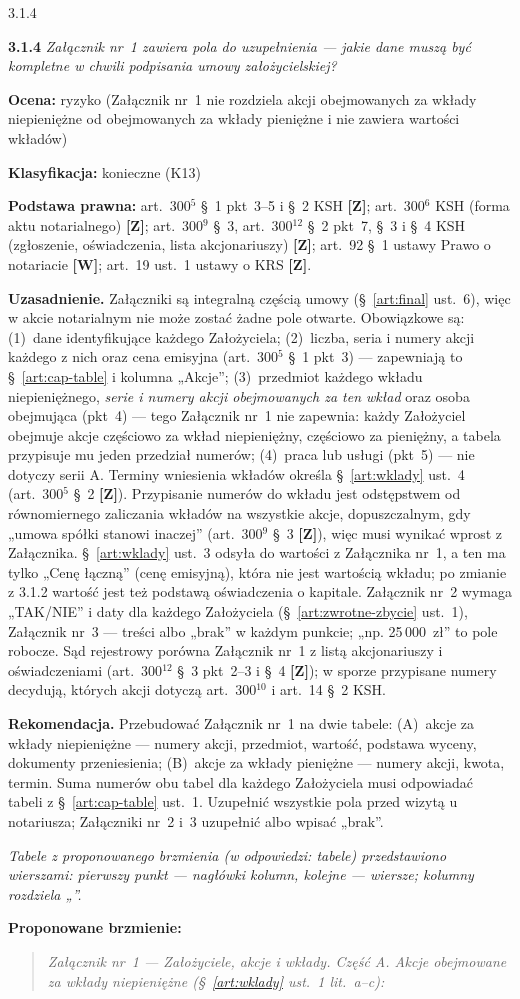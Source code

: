 \documentclass[12pt,a4paper]{report}
\newcommand{\MemoPyt}[2]{\par\noindent\phantomsection\label{memo:#1}\textbf{#1} \textit{#2}\par\smallskip}
\newcommand{\Wiar}[1]{\textbf{[#1]}}
\newcommand{\Ocena}[1]{\textbf{Ocena:} #1\par}
\newcommand{\Podstawa}[1]{\textbf{Podstawa prawna:} #1\par}
\newcommand{\Uzasadnienie}[1]{\textbf{Uzasadnienie.} #1\par}
\newcommand{\Rekomendacja}[1]{\textbf{Rekomendacja.} #1\par}
\newcommand{\Klasa}[1]{\textbf{Klasyfikacja:} #1\par}
\newenvironment{Brzmienie}{\par\textbf{Proponowane brzmienie:}\begin{quote}\itshape}{\end{quote}}
\begin{document}
\begin{MemoBox}{3.1.4}
\MemoPyt{3.1.4}{Załącznik nr~1 zawiera pola do uzupełnienia --- jakie dane muszą być kompletne w chwili podpisania umowy założycielskiej?}
\Ocena{ryzyko (Załącznik nr~1 nie rozdziela akcji obejmowanych za wkłady niepieniężne od obejmowanych za wkłady pieniężne i nie zawiera wartości wkładów)}
\Klasa{konieczne (K13)}
\Podstawa{art.~300$^{5}$ §~1 pkt~3--5 i §~2 KSH \Wiar{Z}; art.~300$^{6}$ KSH (forma aktu notarialnego) \Wiar{Z}; art.~300$^{9}$ §~3, art.~300$^{12}$ §~2 pkt~7, §~3 i §~4 KSH (zgłoszenie, oświadczenia, lista akcjonariuszy) \Wiar{Z}; art.~92 §~1 ustawy Prawo o notariacie \Wiar{W}; art.~19 ust.~1 ustawy o KRS \Wiar{Z}.}
\Uzasadnienie{Załączniki są integralną częścią umowy (§~\ref{art:final} ust.~6), więc w akcie notarialnym nie może zostać żadne pole otwarte. Obowiązkowe są: (1)~dane identyfikujące każdego Założyciela; (2)~liczba, seria i numery akcji każdego z nich oraz cena emisyjna (art.~300$^{5}$ §~1 pkt~3) --- zapewniają to §~\ref{art:cap-table} i kolumna „Akcje”; (3)~przedmiot każdego wkładu niepieniężnego, \emph{serie i numery akcji obejmowanych za ten wkład} oraz osoba obejmująca (pkt~4) --- tego Załącznik nr~1 nie zapewnia: każdy Założyciel obejmuje akcje częściowo za wkład niepieniężny, częściowo za pieniężny, a tabela przypisuje mu jeden przedział numerów; (4)~praca lub usługi (pkt~5) --- nie dotyczy serii A. Terminy wniesienia wkładów określa §~\ref{art:wklady} ust.~4 (art.~300$^{5}$ §~2 \Wiar{Z}). Przypisanie numerów do wkładu jest odstępstwem od równomiernego zaliczania wkładów na wszystkie akcje, dopuszczalnym, gdy „umowa spółki stanowi inaczej” (art.~300$^{9}$ §~3 \Wiar{Z}), więc musi wynikać wprost z Załącznika. §~\ref{art:wklady} ust.~3 odsyła do wartości z Załącznika nr~1, a ten ma tylko „Cenę łączną” (cenę emisyjną), która nie jest wartością wkładu; po zmianie z 3.1.2 wartość jest też podstawą oświadczenia o kapitale. Załącznik nr~2 wymaga „TAK/NIE” i daty dla każdego Założyciela (§~\ref{art:zwrotne-zbycie} ust.~1), Załącznik nr~3 --- treści albo „brak” w każdym punkcie; „np. 25\,000~zł” to pole robocze. Sąd rejestrowy porówna Załącznik nr~1 z listą akcjonariuszy i oświadczeniami (art.~300$^{12}$ §~3 pkt~2--3 i §~4 \Wiar{Z}); w sporze przypisane numery decydują, których akcji dotyczą art.~300$^{10}$ i art.~14 §~2 KSH.}
\Rekomendacja{Przebudować Załącznik nr~1 na dwie tabele: (A)~akcje za wkłady niepieniężne --- numery akcji, przedmiot, wartość, podstawa wyceny, dokumenty przeniesienia; (B)~akcje za wkłady pieniężne --- numery akcji, kwota, termin. Suma numerów obu tabel dla każdego Założyciela musi odpowiadać tabeli z §~\ref{art:cap-table} ust.~1. Uzupełnić wszystkie pola przed wizytą u notariusza; Załączniki nr~2 i~3 uzupełnić albo wpisać „brak”.}
\textit{Tabele z proponowanego brzmienia (w odpowiedzi: tabele) przedstawiono wierszami: pierwszy punkt --- nagłówki kolumn, kolejne --- wiersze; kolumny rozdziela „\textbar”.}
\begin{Brzmienie}
Załącznik nr~1 --- Założyciele, akcje i wkłady. Część A. Akcje obejmowane za wkłady niepieniężne (§~\ref{art:wklady} ust.~1 lit.~a--c):


\end{Brzmienie}
\end{MemoBox}
\end{document}
